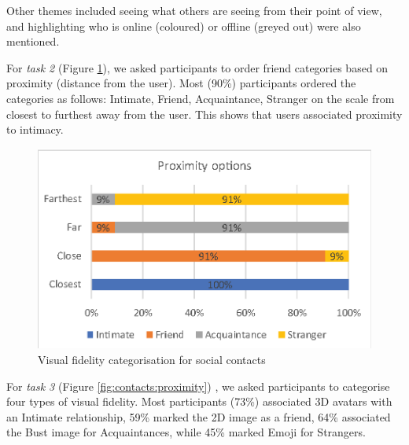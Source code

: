 Other themes included seeing what others are seeing from their point of view, and highlighting who is online (coloured) or offline (greyed out) were also mentioned.



For \textit{task 2} (Figure \ref{fig:contacts:visual-fidelity}), we asked participants to order friend categories based on proximity (distance from the user). Most (90\%) participants ordered the categories as follows: Intimate, Friend, Acquaintance, Stranger on the scale from closest to furthest away from the user. This shows that users associated proximity to intimacy.

\begin{figure}[ht]
    \centering
    \includegraphics[width=.8\linewidth]{images/mgia17/analysis-images-06.eps}
    \caption{Visual fidelity categorisation for social contacts}
    \label{fig:contacts:visual-fidelity}
\end{figure}

For \textit{task 3} 
(Figure \ref{fig:contacts:proximity})
, we asked participants to categorise four types of visual fidelity. Most participants (73\%) associated 3D avatars with an Intimate relationship, 59\% marked the 2D image as a  friend, 64\% associated the Bust image for Acquaintances, while 45\% marked Emoji for Strangers.



